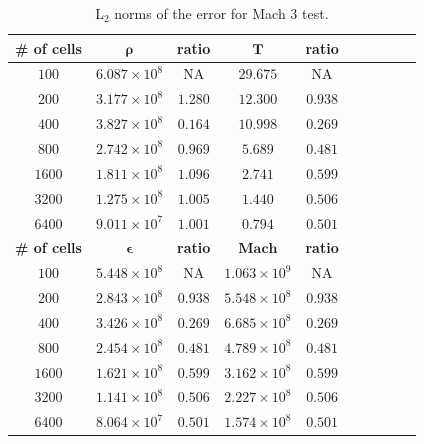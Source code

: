 \documentclass[times,doublespace]{fldauth}%
\begin{document}
%
\begin{table}[H]
\caption{\label{tbl:table1} L$_2$ norms of the error for Mach 3 test.}
\begin{center}
\begin{tabular}{|c|c|c|c|c|c|c|c|c|c|}
\hline
\textbf{\# of cells} & $\mathbf{\rho}$ & \textbf{ratio} & $\mathbf{T}$ & \textbf{ratio} \\ \hline
$100$ & $6.087\times 10^{8}$ & NA &  $29.675$ & NA \\ \hline
$200$ & $3.177\times 10^{8}$ & $1.280$ &  $12.300$ & $0.938$ \\ \hline
$400$ & $3.827\times10^{8}$ & $0.164$ &  $10.998$ & $0.269$ \\ \hline
$800$ & $2.742\times 10^{8}$ & $0.969$ &  $5.689$ & $0.481$ \\ \hline
$1600$ & $1.811\times 10^{8}$ & $1.096$ &  $2.741$ & $0.599$ \\ \hline
$3200$ & $1.275\times 10^{8}$ & $1.005$ & $1.440$ & $0.506$ \\ \hline
$6400$ & $9.011\times 10^{7}$ & $1.001$ & $0.794$ & $0.501$ \\ \hline
\hline
\textbf{\# of cells} & $\mathbf{\epsilon}$ & \textbf{ratio} &  $\mathbf{Mach}$ & \textbf{ratio} \\ \hline
$100$ & $5.448\times 10^{8}$ & NA & $1.063\times 10^9$ & NA	\\ \hline
$200$ & $2.843\times 10^{8}$ & $0.938$ & $5.548\times 10^8$ & $0.938$	\\ \hline
$400$ & $3.426\times 10^{8}$ & $0.269$ & $6.685\times 10^8$ & $0.269$	\\ \hline
$800$ & $2.454\times 10^{8}$ & $0.481$ & $4.789\times 10^8$ & $0.481$	\\  \hline
$1600$&$1.621\times 10^{8}$ & $0.599$ & $3.162\times 10^8$ & $0.599$ \\ \hline 
$3200$ & $1.141\times10^{8}$  & $0.506$ & $2.227\times 10^8$ & $0.506$ \\ \hline   
$6400$ & $8.064\times 10^{7}$  & $0.501$ & $1.574\times10^8$ & $0.501$ \\ \hline   
\end{tabular}  
\end{center}
\end{table}
%
\end{document}
